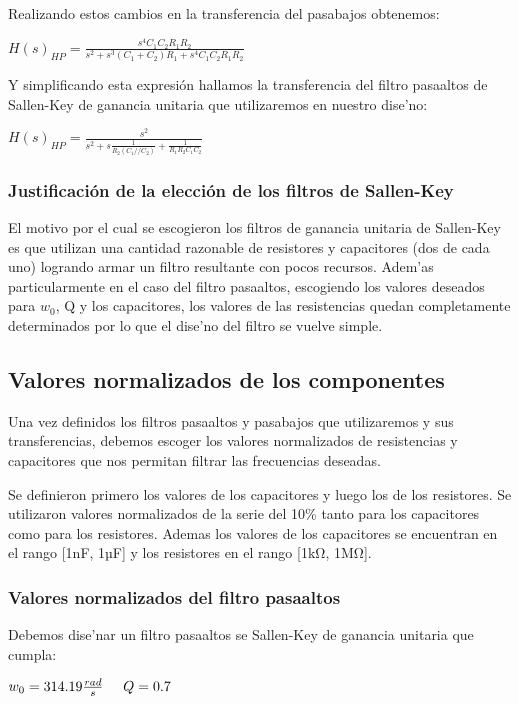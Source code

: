 \documentclass[12pt, titlepage]{article}
\begin{document}
    Realizando estos cambios en la transferencia del pasabajos obtenemos:

    \begin{center}
         \item $H(s)_{HP} = \frac{s^4 C_1C_2R_1R_2}{s^2+s^3(C_1+C_2)R_1+s^4C_1C_2R_1R_2}$
    \end{center}
   
    Y simplificando esta expresión hallamos la transferencia del filtro pasaaltos de Sallen-Key de ganancia unitaria que utilizaremos en nuestro dise'no:
    \begin{center}
        $H(s)_{HP}= \frac{s^2}{s^2+s\frac{1}{R_2(C_1//C_2)}+\frac{1}{R_1R_2C_1C_2}}$
    \end{center}
    
    \subsubsection{Justificación de la elección de los filtros de Sallen-Key}
    El motivo por el cual se escogieron los filtros de ganancia unitaria de Sallen-Key es que utilizan una cantidad razonable de resistores y capacitores (dos de cada uno) logrando armar un filtro resultante con pocos recursos.
    Adem'as particularmente en el caso del filtro pasaaltos, escogiendo los valores deseados para $w_0$, Q y los capacitores, los valores de las resistencias quedan completamente determinados por lo que el dise'no del filtro se vuelve simple. 
    
    \subsection{Valores normalizados de los componentes}
    Una vez definidos los filtros pasaaltos y pasabajos que utilizaremos y sus transferencias, debemos escoger los valores normalizados de resistencias y capacitores que nos permitan filtrar las frecuencias deseadas.
    
    Se definieron primero los valores de los capacitores y luego los de los resistores. Se utilizaron valores normalizados de la serie del 10\% tanto para los capacitores como para los resistores. 
    Ademas los valores de los capacitores se encuentran en el rango [1nF, 1µF] y los resistores en el rango [1kΩ, 1MΩ].

    \subsubsection{Valores normalizados del filtro pasaaltos}
    Debemos dise'nar un filtro pasaaltos se Sallen-Key de ganancia unitaria que cumpla:
    \begin{center}
        $w_{0} = 314.19\frac{rad}{s} \hspace{5mm} Q = 0.7$
    \end{center}
    
\end{document}
